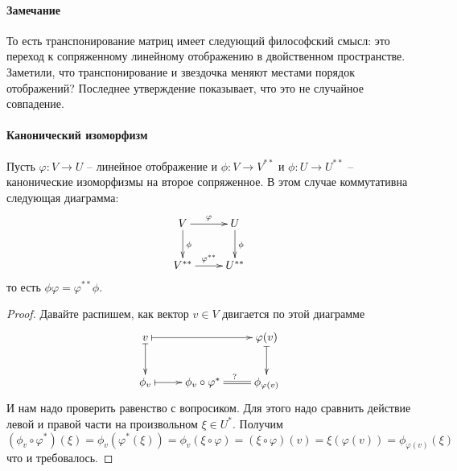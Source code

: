 \paragraph{Замечание}

То есть транспонирование матриц имеет следующий философский смысл: это переход к сопряженному линейному отображению в двойственном пространстве.
Заметили, что транспонирование и звездочка меняют местами порядок отображений?
Последнее утверждение показывает, что это не случайное совпадение.

\paragraph{Канонический изоморфизм}

\begin{claim}
\label{claim::CanonicalIsomorphism}
Пусть $\varphi\colon V\to U$ -- линейное отображение и $\phi\colon V\to V^{**}$ и $\phi\colon U\to U^{**}$ -- канонические изоморфизмы на второе сопряженное.
В этом случае коммутативна следующая диаграмма:
\[
\xymatrix{
	{V}\ar[r]^{\varphi}\ar[d]^{\phi}&{U}\ar[d]^{\phi}\\
	{V^{**}}\ar[r]^{\varphi^{**}}&{U^{**}}
}
\]
то есть $\phi \varphi = \varphi^{**}\phi$.
\end{claim}
\begin{proof}
Давайте распишем, как вектор $v\in V$ двигается по этой диаграмме
\[
\xymatrix{
	{v}\ar@{|->}[rr]\ar@{|->}[d]&{}&{\varphi(v)}\ar@{|->}[d]\\
	{\phi_v}\ar@{|->}[r]&{\phi_v\circ \varphi^*}\ar@{=}[r]^{?}&{\phi_{\varphi(v)}}
}
\]
И нам надо проверить равенство с вопросиком.
Для этого надо сравнить действие левой и правой части на произвольном $\xi\in U^*$.
Получим
\[
(\phi_v\circ \varphi^*)(\xi) = \phi_v(\varphi^*(\xi)) = \phi_v(\xi\circ\varphi) = (\xi\circ \varphi) (v) = \xi(\varphi(v)) = \phi_{\varphi(v)}(\xi)
\]
что и требовалось.
\end{proof}

